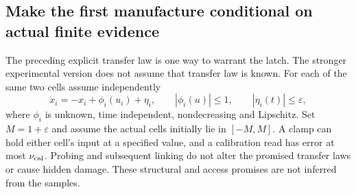 \documentclass[11pt]{article}
\theoremstyle{definition}
\theoremstyle{remark}
\begin{document}
\subsection{Make the first manufacture conditional on actual finite evidence}
The preceding explicit transfer law is one way to warrant the latch. The
stronger experimental version does not assume that transfer law is known.
For each of the same two cells assume independently
\[
 \dot x_i=-x_i+\phi_i(u_i)+\eta_i,\qquad
 |\phi_i(u)|\leq1,\qquad |\eta_i(t)|\leq\varepsilon,
\]
where $\phi_i$ is unknown, time independent, nondecreasing and Lipschitz.
Set $M=1+\varepsilon$ and assume the actual cells initially lie in
$[-M,M]$. A clamp can hold either cell's input at a specified value, and a
calibration read has error at most $\nu_{\rm cal}$. Probing and subsequent
linking do not alter the promised transfer laws or cause hidden damage.
These structural and access promises are not inferred from the samples.
\end{document}
